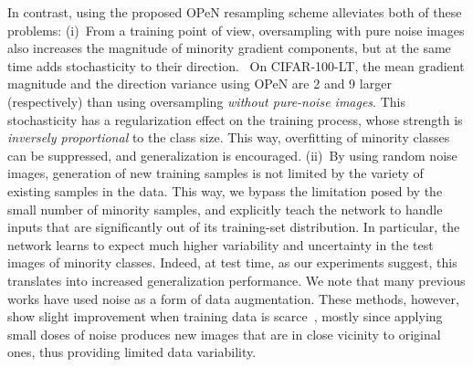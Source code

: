 \documentclass[nohyperref]{article}
\theoremstyle{plain}
\theoremstyle{definition}
\theoremstyle{remark}
\begin{document}
\begin{table*}[t]
\begin{minipage}[c]{0.38\linewidth}
\begin{minipage}[c]{0.55\linewidth}
\end{minipage}
\begin{minipage}[c]{0.41\linewidth}
\vspace*{-0.3cm}
\caption{\textbf{Comparison on Places-LT}
{\it using ImageNet pretrained ResNet-152. Rows with  denote results reported in the original papers.}}
\label{tab:results_places}
\end{minipage}
\end{minipage}
\vspace{-0.5cm}
\end{table*}

 
In contrast, using the proposed OPeN resampling scheme alleviates both of these problems: (i)~From a training point of view, oversampling with pure noise images also increases the magnitude of minority gradient components, but at the same time adds stochasticity to their direction. \ On CIFAR-100-LT, the mean gradient magnitude and the direction variance using OPeN are 2 and 9 larger (respectively) than using oversampling \emph{without pure-noise images}. This stochasticity has a regularization effect on the training process, whose strength is \textit{inversely proportional} to the class size. This way, overfitting of minority classes can be suppressed, and generalization is encouraged. (ii)~By using random noise images, generation of new training samples is not limited by the variety of existing samples in the data. This way, we bypass the limitation posed by the small number of minority samples, and explicitly teach the network to handle inputs that are significantly out of its training-set distribution. In particular, the network learns to expect much higher variability and uncertainty in the test images of minority classes. Indeed, at test time, as our experiments suggest, this translates into increased generalization performance. We note that many previous works have used noise as a form of data augmentation. These methods, however, show slight improvement when training data is scarce~\cite{koziarski2017image}, mostly since applying small doses of noise produces new images that are in close vicinity to original ones, thus providing limited data variability.
\end{document}
